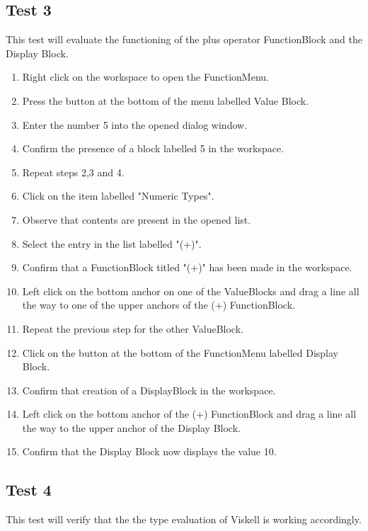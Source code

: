 	\subsection{Test 3}
		This test will evaluate the functioning of the plus operator FunctionBlock and the Display Block.
		
		\begin{enumerate}
			\item Right click on the workspace to open the FunctionMenu.
			\item Press the button at the bottom of the menu labelled Value Block.
			\item Enter the number 5 into the opened dialog window.
			\item Confirm the presence of a block labelled 5 in the workspace.
			\item Repeat steps 2,3 and 4.
			\item Click on the item labelled "Numeric Types".
			\item Observe that contents are present in the opened list.
			\item Select the entry in the list labelled "(+)".
			\item Confirm that a FunctionBlock titled "(+)" has been made in the workspace.
			\item Left click on the bottom anchor on one of the ValueBlocks and drag a line all the way to one of the upper anchors of the (+) FunctionBlock.
			\item Repeat the previous step for the other ValueBlock.
			\item Click on the button at the bottom of the FunctionMenu labelled Display Block.
			\item Confirm that creation of a DisplayBlock in the workspace.
			\item Left click on the bottom anchor of the (+) FunctionBlock and drag a line all the way to the upper anchor of the Display Block.
			\item Confirm that the Display Block now displays the value 10.
		\end{enumerate}
		
	\subsection{Test 4}
		This test will verify that the the type evaluation of Viskell is working accordingly.
		
